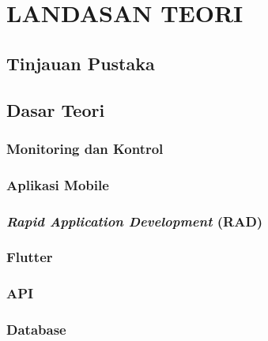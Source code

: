 \chapter{LANDASAN TEORI}

%
\vspace{4.5pt}

\begin{flushleft}
    \section{Tinjauan Pustaka}
    \section{Dasar Teori}
    \begin{justify}
        \subsection{Monitoring dan Kontrol}
\blindtext


        \subsection{Aplikasi Mobile}

        \subsection{\textit{Rapid Application Development} (RAD)}

        \subsection{Flutter}

        \subsection{API}


        \subsection{Database}


\end{justify}
\end{flushleft}
